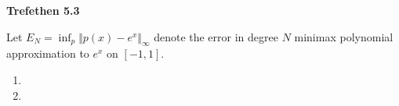 \textbf{Trefethen 5.3}

Let $E_N = \inf_p \Vert p(x) - e^x \Vert_{\infty}$ denote the error in degree $N$ minimax polynomial approximation to 
$e^x$ on $[-1, 1]$.

\begin{enumerate}
  \item 
  \pagebreak
  \item 
\end{enumerate}